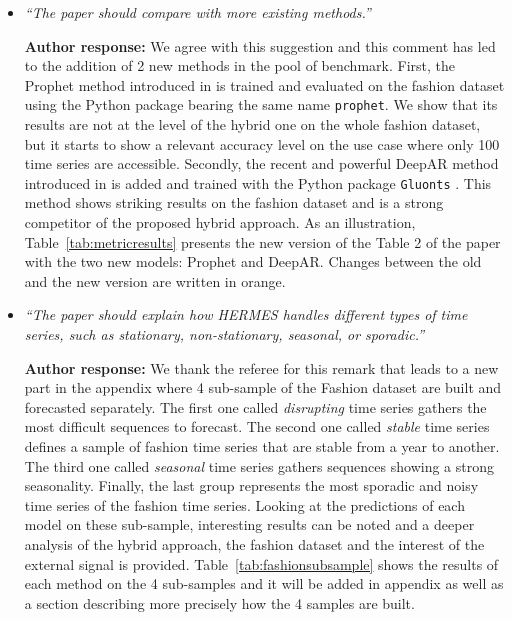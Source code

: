 \documentclass[10pt]{article} %
\begin{document}
\begin{itemize}
	\item {\em ``The paper should compare with more existing methods.''} \medskip
	
	\textbf{Author response:} We agree with this suggestion and this comment has led to the addition of 2 new methods in the pool of benchmark. First, the Prophet method introduced in \citet{Taylor2017} is trained and evaluated on the fashion dataset using the Python package bearing the same name \texttt{prophet}. We show that its results are not at the level of the hybrid one on the whole fashion dataset, but it starts to show a relevant accuracy level on the use case where only 100 time series are accessible. Secondly, the recent and powerful DeepAR method introduced in \citet{salinas2020} is added  and trained with the Python package \texttt{Gluonts} \citep{Alexandrov2020}. This method shows striking results on the fashion dataset and is a strong competitor of the proposed hybrid approach. As an illustration, Table~\ref{tab:metricresults} presents the new version of the Table 2 of the paper with the two new models: Prophet and DeepAR. Changes between the old and the new version are written in orange.\\
	
	\item {\em ``The paper should explain how HERMES handles different types of time series, such as stationary, non-stationary, seasonal, or sporadic.''} \medskip
	
	\textbf{Author response:} We thank the referee for this remark that leads to a new part in the appendix where 4 sub-sample of the Fashion dataset are built and forecasted separately. The first one called \textit{disrupting} time series gathers the most difficult sequences to forecast. The second one called \textit{stable} time series defines a sample of fashion time series that are stable from a year to another. The third one called \textit{seasonal} time series gathers sequences showing a strong seasonality. Finally, the last group represents the most sporadic and noisy time series of the fashion time series. Looking at the predictions of each model on these sub-sample, interesting results can be noted and a deeper analysis of the hybrid approach, the fashion dataset and the interest of the external signal is provided. Table~\ref{tab:fashionsubsample} shows the results of each method on the 4 sub-samples and it will be added in appendix as well as a section describing more precisely how the 4 samples are built.\\
\end{itemize}
\end{document}
